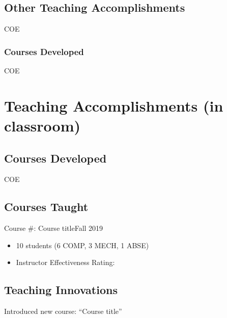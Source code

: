 \subsection{Other Teaching Accomplishments}


\begin{taggedblock}{COE}
  \subsubsection*{Courses Developed}
\end{taggedblock}

\begin{untaggedblock}{COE}
  \section{Teaching Accomplishments (in classroom)}
  \subsection{Courses Developed}  
\end{untaggedblock}


\begin{untaggedblock}{COE}
  \subsection{Courses Taught}
  \begin{outeritemize}
  \item Course \#: Course title\hfill Fall 2019
    \begin{itemize}
    \item[] 10 students (6 COMP, 3 MECH, 1 ABSE)
    \item[] Instructor Effectiveness Rating: 
    \end{itemize}
  \end{outeritemize}

  \subsection{Teaching Innovations}
  \begin{outeritemize}
  \item Introduced new course: ``Course title''
  \end{outeritemize}

\end{untaggedblock}

